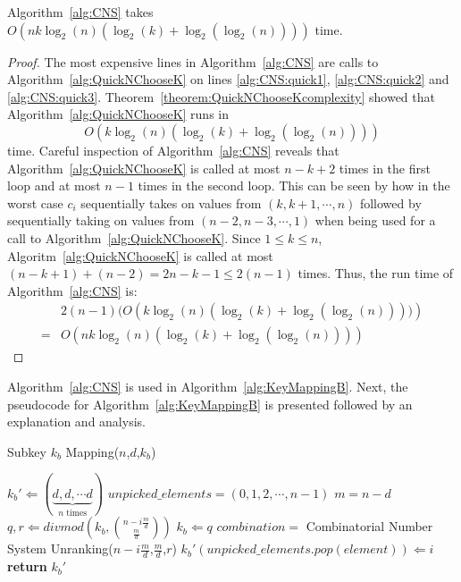 \begin{theorem}
\label{theorem:CNStimeComplexity}
Algorithm~\ref{alg:CNS} takes $O\left(nk\log_2 (n)(\log_2 (k)+\log_2(\log_2 (n)))\right)$ time.
\end{theorem}
\begin{proof}
The most expensive lines in Algorithm~\ref{alg:CNS} are calls to Algorithm~\ref{alg:QuickNChooseK} on lines \ref{alg:CNS:quick1}, \ref{alg:CNS:quick2} and \ref{alg:CNS:quick3}. Theorem~\ref{theorem:QuickNChooseKcomplexity} showed that Algorithm~\ref{alg:QuickNChooseK} runs in $$O\left(k\log_2 (n)(\log_2 (k)+\log_2(\log_2 (n)))\right)$$ time. Careful inspection of Algorithm~\ref{alg:CNS} reveals that Algorithm~\ref{alg:QuickNChooseK} is called at most $n - k +2$ times in the first loop and at most $n-1$ times in the second loop. This can be seen by how in the worst case $c_i$ sequentially takes on values from $(k,k + 1, \cdots ,n)$ followed by sequentially taking on values from $(n-2,n-3, \cdots ,1)$ when being used for a call to Algorithm~\ref{alg:QuickNChooseK}. Since $1 \leq k \leq n$, Algoritm~\ref{alg:QuickNChooseK} is called at most $(n - k + 1) + (n-2) = 2n - k - 1 \leq 2(n - 1)$ times. Thus, the run time of Algorithm~\ref{alg:CNS} is:
\begin{align}
&2(n - 1) (O\left(k\log_2 (n)(\log_2 (k)+\log_2(\log_2 (n))))\right)\\
= &O\left(nk\log_2 (n)(\log_2 (k)+\log_2(\log_2 (n)))\right)
\end{align}
\end{proof}

Algorithm~\ref{alg:CNS} is used in Algorithm~\ref{alg:KeyMappingB}. Next, the pseudocode for Algorithm~\ref{alg:KeyMappingB} is presented followed by an explanation and analysis. 

\begin{algorithm}[H]
  \caption{Subkey $k_b$ Mapping($n$,$d$,$k_b$)}  \label{alg:KeyMappingB}
  \begin{algorithmic}[1]
  \State $k_b' \Longleftarrow (\underbrace{d, d, \cdots d}_{n \text{ times}})$
  \State $\mathit{unpicked\_elements} = (0,1,2, \cdots ,n-1)$
  \State $m = n - d$
   \label{alg:KeyMappingB:mainLoop}
  \State $q,r \Longleftarrow \mathit{divmod}(k_b,{n - i\frac{m}{d} \choose \frac{m}{d}})$ \label{alg:KeyMappingB:divmod}
  \State $k_b \Longleftarrow q$
  \State $\mathit{combination} =$ Combinatorial Number System Unranking($n - i\frac{m}{d}$,$\frac{m}{d}$,$r$) \label{alg:KeyMappingB:CNScall} \label{alg:KeyMappingB:CNS}
  \State $k_b'(\mathit{unpicked\_elements}.\mathit{pop}(\mathit{element})) \Longleftarrow i$ \label{alg:KeyMappingB:addToPermutation}
  \EndFor
  \EndFor
  \State \textbf{return} $k_b'$
  \end{algorithmic}
\end{algorithm}

